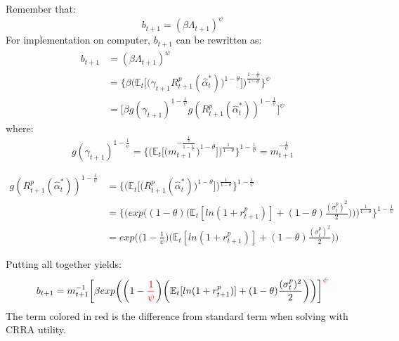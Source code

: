 \documentclass[12pt,a4paper]{article}
\begin{document}
Remember that:
\begin{equation*}
    b_{t+1}=(\beta\Lambda_{t+1})^\psi
\end{equation*}
For implementation on computer, $b_{t+1}$ can be rewritten as:
\begin{align*}
    b_{t+1} &= (\beta\Lambda_{t+1})^\psi\\
        &= \Bigg\{\beta \bigg(\mathbb{E}_t\bigg[\big(\gamma_{t+1}R^{p}_{t+1}(\hat{\alpha}_t^*)\big)^{1-\theta}\bigg]\bigg)^\frac{1-\frac{1}{\psi}}{1-\theta}\Bigg\}^\psi\\
        &= \bigg[\beta g(\gamma_{t+1})^{1-\frac{1}{\psi}}g(R_{t+1}^p(\hat{\alpha}_t^*))^{1-\frac{1}{\psi}}\bigg]^\psi
\end{align*}
where:
\begin{equation*}
  g(\gamma_{t+1})^{1-\frac{1}{\psi}}= \Bigg\{ \Bigg(\mathbb{E}_t\bigg[ \big(m_{t+1}^{-\frac{\frac{1}{\psi}}{1-\frac{1}{\psi}}}\big)^{1-\theta}\bigg]\Bigg)^{\frac{1}{1-\theta}}\Bigg\}^{1-\frac{1}{\psi}}=m_{t+1}^{-\frac{1}{\psi}}
\end{equation*}

\begin{align*}
  g(R_{t+1}^p(\hat{\alpha}_t^*))^{1-\frac{1}{\psi}}&= \Bigg\{ \Bigg(\mathbb{E}_t\bigg[ \big(  R_{t+1}^p(\hat{\alpha}_t^*)          \big)^{1-\theta}\bigg]\Bigg)^{\frac{1}{1-\theta}}\Bigg\}^{1-\frac{1}{\psi}}\\
  &= \Bigg\{ \Bigg(  exp\bigg((1-\theta)\bigg(\mathbb{E}_t[ln(1+r^p_{t+1})]+(1-\theta)\frac{(\sigma_t^p)^2}{2}\bigg)\bigg)      \Bigg)^{\frac{1}{1-\theta}}\Bigg\}^{1-\frac{1}{\psi}}\\
  &= exp\bigg(\bigg(1-\frac{1}{\psi}\bigg)\bigg(\mathbb{E}_t[ln(1+r^p_{t+1})]+(1-\theta)\frac{(\sigma_t^p)^2}{2}\bigg)\bigg)
\end{align*}

Putting all together yields:
\begin{equation*}
    b_{t+1}=m_{t+1}^{-1}\bigg[\beta  exp\bigg(\bigg(1-\textcolor{red}{\frac{1}{\psi}}\bigg)\bigg(\mathbb{E}_t[ln(1+r^p_{t+1})]+(1-\theta)\frac{(\sigma_t^p)^2}{2}\bigg)\bigg)\bigg]^{\textcolor{red}{\psi}}
\end{equation*}
The term colored in red is the difference from standard term when solving with CRRA utility.
\end{document}
